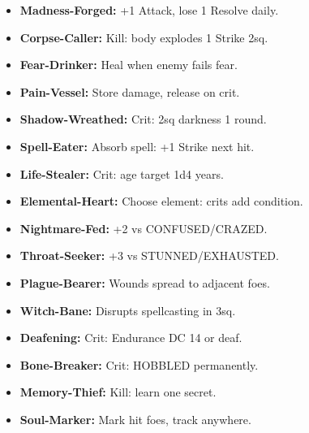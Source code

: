 \documentclass[10pt,twoside]{article}
\begin{document}
\hfill
\begin{minipage}[t]{0.48\textwidth}
\begin{itemize}[leftmargin=0.3cm, itemsep=0.1cm]
\item \textcolor{rarecolor}{\textbf{Madness-Forged:}} \textcolor{rarecolor}{+1 Attack, lose 1 Resolve daily.}
\item \textcolor{rarecolor}{\textbf{Corpse-Caller:}} \textcolor{rarecolor}{Kill: body explodes 1 Strike 2sq.}
\item \textcolor{rarecolor}{\textbf{Fear-Drinker:}} \textcolor{rarecolor}{Heal when enemy fails fear.}
\item \textcolor{rarecolor}{\textbf{Pain-Vessel:}} \textcolor{rarecolor}{Store damage, release on crit.}
\item \textcolor{rarecolor}{\textbf{Shadow-Wreathed:}} \textcolor{rarecolor}{Crit: 2sq darkness 1 round.}
\item \textcolor{rarecolor}{\textbf{Spell-Eater:}} \textcolor{rarecolor}{Absorb spell: +1 Strike next hit.}
\item \textcolor{rarecolor}{\textbf{Life-Stealer:}} \textcolor{rarecolor}{Crit: age target 1d4 years.}
\item \textcolor{rarecolor}{\textbf{Elemental-Heart:}} \textcolor{rarecolor}{Choose element: crits add condition.}
\item \textcolor{rarecolor}{\textbf{Nightmare-Fed:}} \textcolor{rarecolor}{+2 vs CONFUSED/CRAZED.}
\item \textcolor{rarecolor}{\textbf{Throat-Seeker:}} \textcolor{rarecolor}{+3 vs STUNNED/EXHAUSTED.}
\item \textcolor{rarecolor}{\textbf{Plague-Bearer:}} \textcolor{rarecolor}{Wounds spread to adjacent foes.}
\item \textcolor{rarecolor}{\textbf{Witch-Bane:}} \textcolor{rarecolor}{Disrupts spellcasting in 3sq.}
\item \textcolor{rarecolor}{\textbf{Deafening:}} \textcolor{rarecolor}{Crit: Endurance DC 14 or deaf.}
\item \textcolor{rarecolor}{\textbf{Bone-Breaker:}} \textcolor{rarecolor}{Crit: HOBBLED permanently.}
\item \textcolor{rarecolor}{\textbf{Memory-Thief:}} \textcolor{rarecolor}{Kill: learn one secret.}
\item \textcolor{rarecolor}{\textbf{Soul-Marker:}} \textcolor{rarecolor}{Mark hit foes, track anywhere.}
\end{itemize}
\end{minipage}
\end{document}
